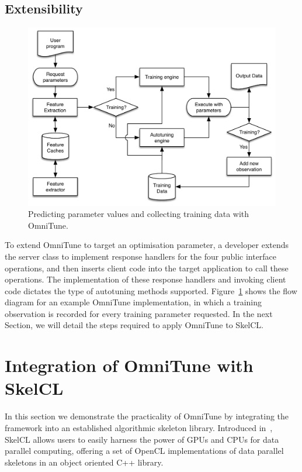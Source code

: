 \documentclass[nonatbib,preprint,9pt]{sigplanconf}
\begin{document}
\subsection{Extensibility}

\begin{figure}
\centering
\includegraphics[width=\columnwidth]{img/omnitune-system-flow.pdf}
\caption[Optimisation parameter selection with OmniTune]{%
  Predicting parameter values and collecting training data with
  OmniTune.%
}
\label{fig:omnitune-system-flow}
\end{figure}

To extend OmniTune to target an optimisation parameter, a developer
extends the server class to implement response handlers for the four
public interface operations, and then inserts client code into the
target application to call these operations. The implementation of
these response handlers and invoking client code dictates the type of
autotuning methods supported. Figure~\ref{fig:omnitune-system-flow}
shows the flow diagram for an example OmniTune implementation, in
which a training observation is recorded for every training parameter
requested. In the next Section, we will detail the steps required to
apply OmniTune to SkelCL.


\section{Integration of OmniTune with SkelCL}\label{sec:omnitune-skelcl}

In this section we demonstrate the practicality of OmniTune by
integrating the framework into an established algorithmic skeleton
library. Introduced in~\cite{Steuwer2011}, SkelCL allows users to
easily harness the power of GPUs and CPUs for data parallel computing,
offering a set of OpenCL implementations of data parallel skeletons in
an object oriented C++ library.
\end{document}

